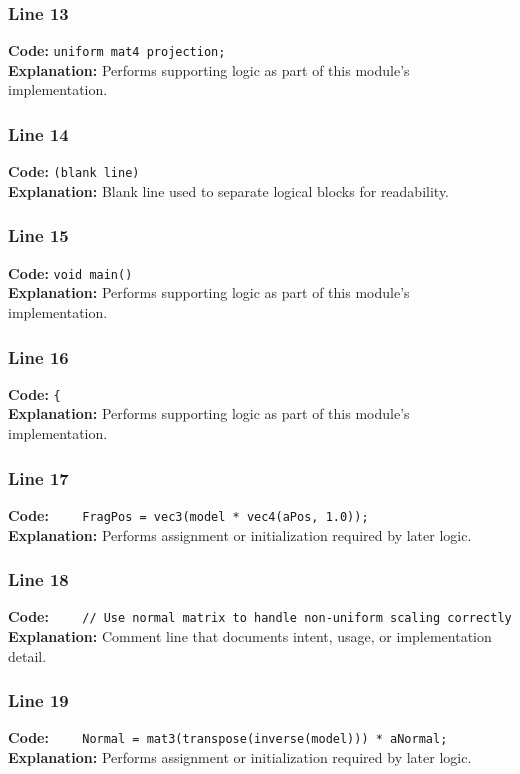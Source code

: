 \documentclass[11pt,a4paper]{article}
\begin{document}
\subsubsection*{Line 13}
\textbf{Code:} \verb|uniform mat4 projection;|\\
\textbf{Explanation:} Performs supporting logic as part of this module's implementation.

\subsubsection*{Line 14}
\textbf{Code:} \texttt{(blank line)}\\
\textbf{Explanation:} Blank line used to separate logical blocks for readability.

\subsubsection*{Line 15}
\textbf{Code:} \verb|void main()|\\
\textbf{Explanation:} Performs supporting logic as part of this module's implementation.

\subsubsection*{Line 16}
\textbf{Code:} \verb|{|\\
\textbf{Explanation:} Performs supporting logic as part of this module's implementation.

\subsubsection*{Line 17}
\textbf{Code:} \verb|    FragPos = vec3(model * vec4(aPos, 1.0));|\\
\textbf{Explanation:} Performs assignment or initialization required by later logic.

\subsubsection*{Line 18}
\textbf{Code:} \verb|    // Use normal matrix to handle non-uniform scaling correctly|\\
\textbf{Explanation:} Comment line that documents intent, usage, or implementation detail.

\subsubsection*{Line 19}
\textbf{Code:} \verb|    Normal = mat3(transpose(inverse(model))) * aNormal;|\\
\textbf{Explanation:} Performs assignment or initialization required by later logic.
\end{document}
